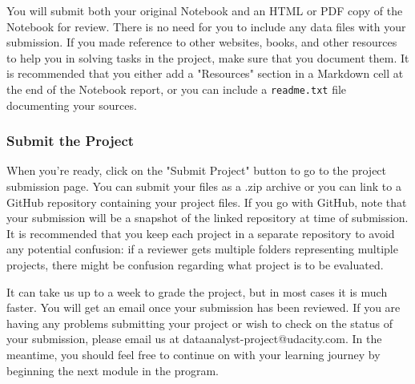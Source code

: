 \documentclass[11pt]{article}
\begin{document}
You will submit both your original Notebook and an HTML or PDF copy of
the Notebook for review. There is no need for you to include any data
files with your submission. If you made reference to other websites,
books, and other resources to help you in solving tasks in the project,
make sure that you document them. It is recommended that you either add
a "Resources" section in a Markdown cell at the end of the Notebook
report, or you can include a \texttt{readme.txt} file documenting your
sources.

\subsubsection{Submit the Project}\label{submit-the-project}

When you're ready, click on the "Submit Project" button to go to the
project submission page. You can submit your files as a .zip archive or
you can link to a GitHub repository containing your project files. If
you go with GitHub, note that your submission will be a snapshot of the
linked repository at time of submission. It is recommended that you keep
each project in a separate repository to avoid any potential confusion:
if a reviewer gets multiple folders representing multiple projects,
there might be confusion regarding what project is to be evaluated.

It can take us up to a week to grade the project, but in most cases it
is much faster. You will get an email once your submission has been
reviewed. If you are having any problems submitting your project or wish
to check on the status of your submission, please email us at
dataanalyst-project@udacity.com. In the meantime, you should feel free
to continue on with your learning journey by beginning the next module
in the program.


    
    
    
    
\end{document}
